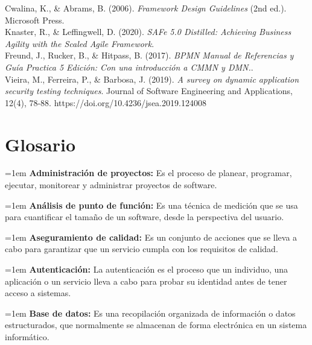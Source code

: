 \documentclass[12pt,letterpaper,spanish, xcolor=table]{report}
\numberwithin{figure}{subsection}
\begin{document}
	Cwalina, K., \& Abrams, B. (2006). \textit{Framework Design Guidelines} (2nd ed.). Microsoft Press.\\
	
	Knaster, R., \& Leffingwell, D. (2020). \textit{SAFe 5.0 Distilled: Achieving Business Agility with the Scaled Agile Framework}.\\
	
	Freund, J., Rucker, B., \& Hitpass, B. (2017). \textit{BPMN Manual de Referencias y Guía Practica 5 Edición: Con una introducción a CMMN y DMN.}.\\
	
	Vieira, M., Ferreira, P., \& Barbosa, J. (2019). \textit{A survey on dynamic application security testing techniques}. Journal of Software Engineering and Applications, 12(4), 78-88. https://doi.org/10.4236/jsea.2019.124008
	

\newpage	
\chapter{Glosario}

	{\leftskip=1em 
		\noindent 
		\textbf{Administración de proyectos:} Es el proceso de planear, programar, ejecutar, monitorear y administrar proyectos de software. \\
	\par}

	{\leftskip=1em 
		\noindent 
		\textbf{Análisis de punto de función: } Es una técnica de medición que se usa para cuantificar el tamaño de un software, desde la perspectiva del usuario. \\
	\par}
	
	
	{\leftskip=1em 
		\noindent 
		\textbf{Aseguramiento de calidad: }  Es un conjunto de acciones que se lleva a cabo para garantizar que un servicio cumpla con los requisitos de calidad.\\
	\par}


	{\leftskip=1em 
		\noindent 
		\textbf{Autenticación: } La autenticación es el proceso que un individuo, una aplicación o un servicio lleva a cabo para probar su identidad antes de tener acceso a sistemas. \\
	\par}
	
	
	{\leftskip=1em 
		\noindent 
		\textbf{Base de datos: } Es una recopilación organizada de información o datos estructurados, que normalmente se almacenan de forma electrónica en un sistema informático.\\
	\par}
	
\end{document}
